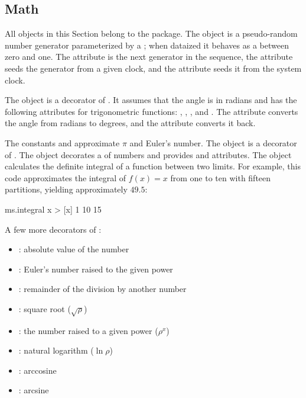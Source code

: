 
\subsection{Math}\label{sec:math}

All objects in this Section belong to the  package.
%
The  object is a pseudo-random number generator
  parameterized by a ; when dataized it behaves as a
   between zero and one.
The  attribute is the next generator in the sequence,
  the  attribute seeds the generator from a given clock,
  and the  attribute seeds it from the system clock.

The  object is a decorator of .
It assumes that the angle is in radians and has the following attributes
  for trigonometric functions:
  , , , and .
The  attribute converts the angle from radians to degrees,
  and the  attribute converts it back.

The constants  and  approximate \(\pi\) and Euler's number.
%
The  object is a decorator of .
%
The  object decorates a  of numbers and provides
   and  attributes.
%
The  object calculates the definite integral of a function
  between two limits.
For example, this code approximates the integral of \(f(x) = x\)
  from one to ten with fifteen partitions, yielding approximately \(49.5\):

\begin{ffcode}
ms.integral
  x > [x]
  1
  10
  15
\end{ffcode}

A few more decorators of :

\begin{itemize}
    \item {}: absolute value of the number
    \item {}: Euler's number raised to the given power
    \item {}: remainder of the division by another number
    \item {}: square root (\(\sqrt{\rho}\))
    \item {}: the number raised to a given power (\(\rho^x\))
    \item {}: natural logarithm (\(\ln \rho\))
    \item {}: arccosine
    \item {}: arcsine
\end{itemize}
